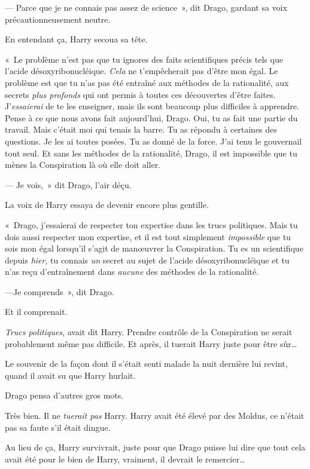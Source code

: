 --- Parce que je ne connais pas assez de science~», dit Drago, gardant sa voix précautionneusement neutre.

En entendant ça, Harry secoua sa tête.

«~Le problème n'est pas que tu ignores des faits scientifiques précis tels que l'acide désoxyribonucléique.
\emph{Cela} ne t'empêcherait pas d'être mon égal.
Le problème est que tu n'as pas été entraîné aux méthodes de la rationalité, aux secrets \emph{plus profonds} qui ont permis à toutes ces découvertes d'être faites.
J'\emph{essaierai} de te les enseigner, mais ils sont beaucoup plus difficiles à apprendre.
Pense à ce que nous avons fait aujourd'hui, Drago.
Oui, tu as fait une partie du travail.
Mais c'était moi qui tenais la barre.
Tu as répondu à certaines des questions.
Je les ai toutes posées.
Tu as donné de la force.
J'ai tenu le gouvernail tout seul.
Et sans les méthodes de la rationalité, Drago, il est impossible que tu mènes la Conspiration là où elle doit aller.

--- Je vois,~» dit Drago, l'air déçu.

La voix de Harry essaya de devenir encore plus gentille.

«~Drago, j'essaierai de respecter ton expertise dans les trucs politiques.
Mais tu dois aussi respecter mon expertise, et il est tout simplement \emph{impossible} que tu sois mon égal lorsqu'il s'agit de manœuvrer la Conspiration.
Tu es un scientifique depuis \emph{hier}, tu connais \emph{un} secret au sujet de l'acide désoxyribonucléique et tu n'as reçu d'entraînement dans \emph{aucune} des méthodes de la rationalité.

---Je comprends~», dit Drago.

Et il comprenait.

\emph{Trucs politiques}, avait dit Harry.
Prendre contrôle de la Conspiration ne serait probablement même pas difficile.
Et après, il tuerait Harry juste pour être sûr…

Le souvenir de la façon dont il s'était senti malade la nuit dernière lui revint, quand il avait su que Harry hurlait.

Drago pensa d'autres gros mots.

Très bien.
Il ne \emph{tuerait pas} Harry.
Harry avait été élevé par des Moldus, ce n'était pas sa faute s'il était dingue.

Au lieu de ça, Harry survivrait, juste pour que Drago puisse lui dire que tout cela avait été pour le bien de Harry, vraiment, il devrait le remercier…

